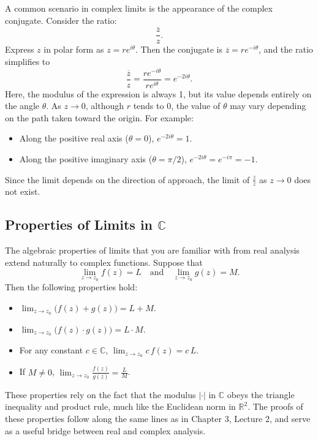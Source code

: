\noindent A common scenario in complex limits is the appearance of the complex conjugate. Consider the ratio:
\[
\frac{\overline{z}}{z}.
\]
Express \(z\) in polar form as \(z = re^{i\theta}\). Then the conjugate is \(\overline{z} = re^{-i\theta}\), and the ratio simplifies to
\[
\frac{\overline{z}}{z} = \frac{re^{-i\theta}}{re^{i\theta}} = e^{-2i\theta}.
\]
Here, the modulus of the expression is always 1, but its value depends entirely on the angle \(\theta\). As \(z \to 0\), although \(r\) tends to 0, the value of \(\theta\) may vary depending on the path taken toward the origin. For example:
\begin{itemize}
    \item Along the positive real axis (\(\theta = 0\)), \(e^{-2i\theta} = 1\).
    \item Along the positive imaginary axis (\(\theta = \pi/2\)), \(e^{-2i\theta} = e^{-i\pi} = -1\).
\end{itemize}
Since the limit depends on the direction of approach, the limit of \(\frac{\overline{z}}{z}\) as \(z \to 0\) does not exist.

\subsection*{Properties of Limits in \(\mathbb{C}\)}

\noindent The algebraic properties of limits that you are familiar with from real analysis extend naturally to complex functions. Suppose that 
\[
\lim_{z \to z_0} f(z) = L \quad \text{and} \quad \lim_{z \to z_0} g(z) = M.
\]
Then the following properties hold:
\begin{itemize}
  \item \(\displaystyle \lim_{z \to z_0} \bigl(f(z) + g(z)\bigr) = L + M\).
  \item \(\displaystyle \lim_{z \to z_0} \bigl(f(z) \cdot g(z)\bigr) = L \cdot M\).
  \item For any constant \(c \in \mathbb{C}\), \(\displaystyle \lim_{z \to z_0} c\,f(z) = c\,L\).
  \item If \(M \neq 0\), \(\displaystyle \lim_{z \to z_0} \frac{f(z)}{g(z)} = \frac{L}{M}\).
\end{itemize}
These properties rely on the fact that the modulus \(|\cdot|\) in \(\mathbb{C}\) obeys the triangle inequality and product rule, much like the Euclidean norm in \(\mathbb{R}^2\). The proofs of these properties follow along the same lines as in Chapter 3, Lecture 2, and serve as a useful bridge between real and complex analysis.

